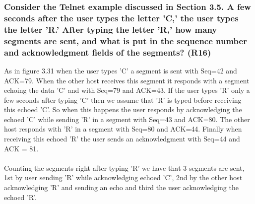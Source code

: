\subsubsection{Consider the Telnet example discussed in Section 3.5. A few seconds after the user types the letter 'C,' the user types the letter 'R.' After typing the letter 'R,' how many segments are sent, and what is put in the sequence number and acknowledgment fields of the segments? (R16)}

As in figure 3.31 when the user types 'C' a segment is sent with Seq=42 and ACK=79. When the other host receives this segment it responds with a segment echoing the data 'C' and with Seq=79 and ACK=43. If the user types 'R' only a few seconds after typing 'C' then we assume that 'R' is typed before receiving this echoed 'C'. So when this happens the user responds by acknowledging the echoed 'C' while sending 'R' in a segment with Seq=43 and ACK=80. The other host responds with 'R' in a segment with Seq=80 and ACK=44. Finally when receiving this echoed 'R' the user sends an acknowledgment with Seq=44 and ACK = 81. \\
\\
Counting the segments right after typing 'R' we have that 3 segments are sent, 1st by user sending 'R' while acknowledging echoed 'C', 2nd by the other host acknowledging 'R' and sending an echo and third the user acknowledging the echoed 'R'.
